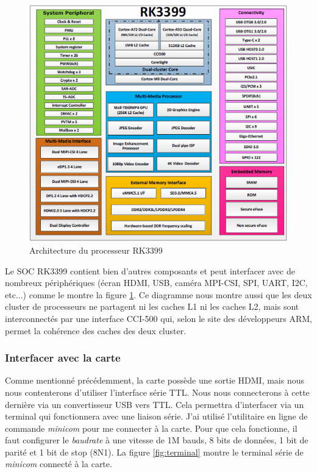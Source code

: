 \begin{figure}[H]
    \centering
    \includegraphics[width=0.45\paperwidth]{Images/RK3399_Block_Diagram.png}
    \caption{Architecture du processeur RK3399}
    \label{fig:archi_rk3399}
\end{figure}

Le SOC RK3399 contient bien d'autres composants et peut interfacer avec de nombreux périphériques (écran HDMI, USB, caméra MPI-CSI, SPI, UART, I2C, etc...) comme le montre la figure \ref{fig:archi_rk3399}. Ce diagramme nous montre aussi que les deux \gls{cluster} de processeurs ne partagent ni les caches L1 ni les caches L2, mais sont interconnectés par une interface CCI-500 qui, selon le site des développeurs ARM, permet la cohérence des caches des deux cluster.


\subsubsection{Interfacer avec la carte}

Comme mentionné précédemment, la carte possède une sortie HDMI, mais nous nous contenterons d'utiliser l'interface série TTL. Nous nous connecterons à cette dernière via un convertisseur USB vers TTL. Cela permettra d'interfacer via un terminal qui fonctionnera avec une liaison série. J'ai utilisé l'utilitaire en ligne de commande \textit{minicom} pour me connecter à la carte. Pour que cela fonctionne, il faut configurer le \textit{baudrate} à une vitesse de 1M bauds, 8 bits de données, 1 bit de parité et 1 bit de stop (8N1).
La figure \ref{fig:terminal} montre le terminal série de \textit{minicom} connecté à la carte.


